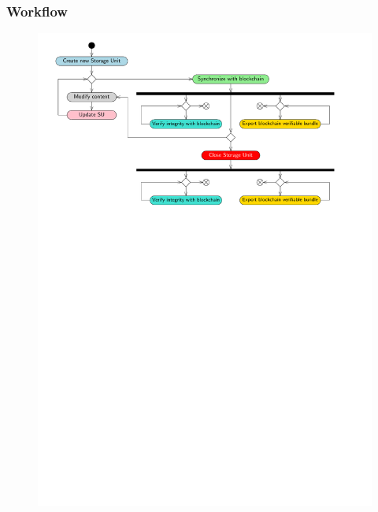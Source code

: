 \documentclass{beamer}
\begin{document}
\begin{frame}
	\frametitle{Workflow}
	\centering
	\begin{figure}
		\includegraphics[width=\textwidth]{figures/activityDiag.pdf}
	\end{figure}
\end{frame}
\end{document}
